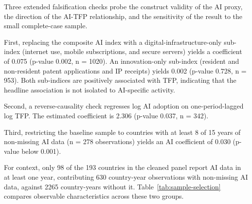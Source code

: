 Three extended falsification checks probe the construct validity of the AI proxy, the direction of the AI-TFP relationship, and the sensitivity of the result to the small complete-case sample.

First, replacing the composite AI index with a digital-infrastructure-only sub-index (internet use, mobile subscriptions, and secure servers) yields a coefficient of 0.075 (p-value 0.002, n = 1020). An innovation-only sub-index (resident and non-resident patent applications and IP receipts) yields 0.002 (p-value 0.728, n = 953). Both sub-indices are positively associated with TFP, indicating that the headline association is not isolated to AI-specific activity.

Second, a reverse-causality check regresses log AI adoption on one-period-lagged log TFP. The estimated coefficient is 2.306 (p-value 0.037, n = 342).

Third, restricting the baseline sample to countries with at least 8 of 15 years of non-missing AI data (n = 278 observations) yields an AI coefficient of 0.030 (p-value below 0.001).

For context, only 98 of the 193 countries in the cleaned panel report AI data in at least one year, contributing 630 country-year observations with non-missing AI data, against 2265 country-years without it. Table~\ref{tab:sample-selection} compares observable characteristics across these two groups.